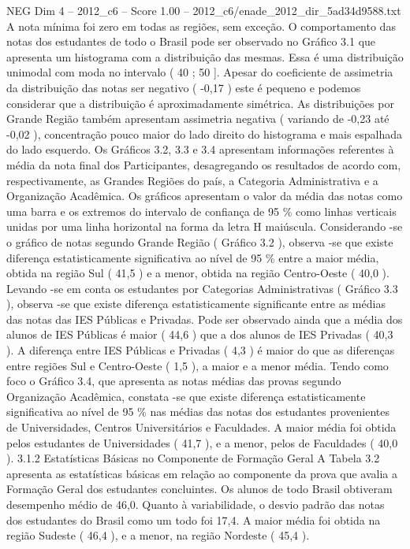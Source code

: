 \begin{textsample}{NEG Dim 4 – 2012\_c6 – Score 1.00 – 2012\_c6/enade\_2012\_dir\_5ad34d9588.txt}
A nota mínima foi zero em todas as regiões, sem exceção.
O comportamento das notas dos estudantes de todo o Brasil pode ser observado no Gráfico 3.1 que apresenta um histograma com a distribuição das mesmas.
Essa é uma distribuição unimodal com moda no intervalo ( 40 ; 50 ].
Apesar do coeficiente de assimetria da distribuição das notas ser negativo ( -0,17 ) este é pequeno e podemos considerar que a distribuição é aproximadamente simétrica.
As distribuições por Grande Região também apresentam assimetria negativa ( variando de -0,23 até -0,02 ), concentração pouco maior do lado direito do histograma e mais espalhada do lado esquerdo.
Os Gráficos 3.2, 3.3 e 3.4 apresentam informações referentes à média da nota final dos Participantes, desagregando os resultados de acordo com, respectivamente, as Grandes Regiões do país, a Categoria Administrativa e a Organização Acadêmica.
Os gráficos apresentam o valor da média das notas como uma barra e os extremos do intervalo de confiança de 95 \% como linhas verticais unidas por uma linha horizontal na forma da letra H maiúscula.
Considerando -se o gráfico de notas segundo Grande Região ( Gráfico 3.2 ), observa -se que existe diferença estatisticamente significativa ao nível de 95 \% entre a maior média, obtida na região Sul ( 41,5 ) e a menor, obtida na região Centro-Oeste ( 40,0 ).
Levando -se em conta os estudantes por Categorias Administrativas ( Gráfico 3.3 ), observa -se que existe diferença estatisticamente significante entre as médias das notas das IES Públicas e Privadas.
Pode ser observado ainda que a média dos alunos de IES Públicas é maior ( 44,6 ) que a dos alunos de IES Privadas ( 40,3 ).
A diferença entre IES Públicas e Privadas ( 4,3 ) é maior do que as diferenças entre regiões Sul e Centro-Oeste ( 1,5 ), a maior e a menor média.
Tendo como foco o Gráfico 3.4, que apresenta as notas médias das provas segundo Organização Acadêmica, constata -se que existe diferença estatisticamente significativa ao nível de 95 \% nas médias das notas dos estudantes provenientes de Universidades, Centros Universitários e Faculdades.
A maior média foi obtida pelos estudantes de Universidades ( 41,7 ), e a menor, pelos de Faculdades ( 40,0 ). 3.1.2 Estatísticas Básicas no Componente de Formação Geral A Tabela 3.2 apresenta as estatísticas básicas em relação ao componente da prova que avalia a Formação Geral dos estudantes concluintes.
Os alunos de todo Brasil obtiveram desempenho médio de 46,0.
Quanto à variabilidade, o desvio padrão das notas dos estudantes do Brasil como um todo foi 17,4.
A maior média foi obtida na região Sudeste ( 46,4 ), e a menor, na região Nordeste ( 45,4 ).

\end{textsample}
